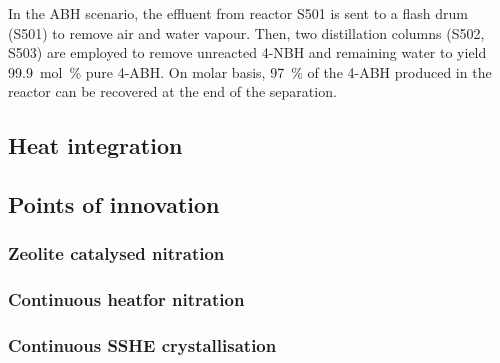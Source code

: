 In the ABH scenario, the effluent from reactor S501 is sent to a flash drum (S501) to remove air and water vapour. Then, two distillation columns (S502, S503) are employed to remove unreacted 4-NBH and remaining water to yield  \SI{99.9}{mol\percent} pure 4-ABH. On molar basis, \SI{97}{\percent} of the 4-ABH produced in the reactor can be recovered at the end of the separation.






\subsection{Heat integration}


\subsection{Points of innovation}

\subsubsection{Zeolite catalysed nitration}

\subsubsection{Continuous heatfor nitration}

\subsubsection{Continuous SSHE crystallisation}